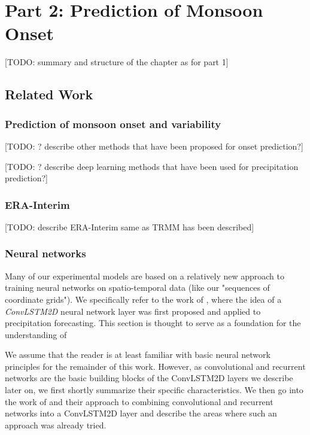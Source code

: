 \chapter{Part 2: Prediction of Monsoon Onset}
\label{c:part2}
[TODO: summary and structure of the chapter as for part 1]

\section{Related Work}
\subsection{Prediction of monsoon onset and variability}
\label{sst:related_prediction}
[TODO: ? describe other methods that have been proposed for onset prediction?]

[TODO: ? describe deep learning methods that have been used for precipitation prediction?]


\clearpage
\subsection{ERA-Interim}
\label{sst:era_interim}
[TODO: describe ERA-Interim same as TRMM has been described]

\clearpage
\subsection{Neural networks}
\label{sst:conv_recurrent_networks}
Many of our experimental models are based on a relatively new approach to training neural networks on spatio-temporal data (like our "sequences of coordinate grids"). We specifically refer to the work of \citet{Shi.2015}, where the idea of a \textit{ConvLSTM2D} neural network layer was first proposed and applied to precipitation forecasting. This section is thought to serve as a foundation for the understanding of 

We assume that the reader is at least familiar with basic neural network principles for the remainder of this work. However, as convolutional and recurrent networks are the basic building blocks of the ConvLSTM2D layers we describe later on, we first shortly summarize their specific characteristics. We then go into the work of \citet{Shi.2015} and their approach to combining convolutional and recurrent networks into a ConvLSTM2D layer and describe the areas where such an approach was already tried.

